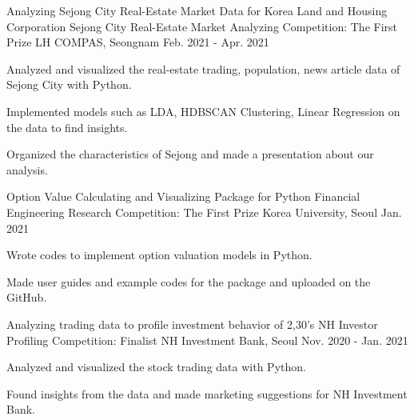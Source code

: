 

\begin{cventries}

  \cventry
    {Analyzing Sejong City Real-Estate Market Data for Korea Land and Housing Corporation} %
    {Sejong City Real-Estate Market Analyzing Competition: The First Prize} %
    {LH COMPAS, Seongnam} %
    {Feb. 2021 - Apr. 2021} %
    {
      \begin{cvitems} %
        \item {Analyzed and visualized the real-estate trading, population, news article data of Sejong City with Python.}
        \item {Implemented models such as LDA, HDBSCAN Clustering, Linear Regression on the data to find insights. }
        \item {Organized the characteristics of Sejong and made a presentation about our analysis.}
      \end{cvitems}
    }

  \cventry
    {Option Value Calculating and Visualizing Package for Python} %
    {Financial Engineering Research Competition: The First Prize} %
    {Korea University, Seoul} %
    {Jan. 2021} %
    {
      \begin{cvitems} %
        \item {Wrote codes to implement option valuation models in Python.}
        \item {Made user guides and example codes for the package and uploaded on the GitHub.}
      \end{cvitems}
    }
    
  \cventry
    {Analyzing trading data to profile investment behavior of 2,30's} %
    {NH Investor Profiling Competition: Finalist} %
    {NH Investment Bank, Seoul} %
    {Nov. 2020 - Jan. 2021} %
    {
      \begin{cvitems} %
        \item {Analyzed and visualized the stock trading data with Python.}
        \item {Found insights from the data and made marketing suggestions for NH Investment Bank.}
      \end{cvitems}
    }


\end{cventries}
